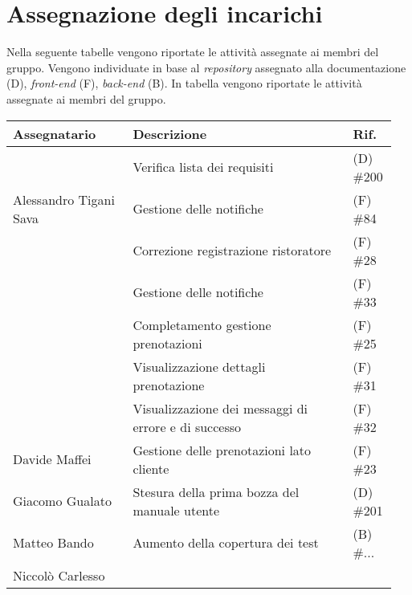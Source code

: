 \section{Assegnazione degli incarichi}
Nella seguente tabelle vengono riportate le attività assegnate ai membri del 
gruppo. Vengono individuate in base al \textit{repository} assegnato alla 
documentazione (D), \textit{front-end} (F), \textit{back-end} (B).
In tabella vengono riportate le attività assegnate ai membri del gruppo.
\begin{center}
	{
		\renewcommand{\arraystretch}{1.5}
		\begin{tabular}{p{0.30\linewidth}|p{0.55\linewidth}|p{0.10\linewidth}}
			\textbf{Assegnatario}        & \textbf{Descrizione} & \textbf{Rif.} \\

			\hline
			\multirow{3}{*}{Alessandro Tigani Sava} & Verifica lista dei requisiti							& (D) \#200            \\ 
			\cline{2-3}
													& Gestione delle notifiche								& (F) \#84             \\
			\hline
			\multirow{5}{*}{Carlo Rosso}			& Correzione registrazione ristoratore					& (F) \#28				\\
			\cline{2-3}
													& Gestione delle notifiche								& (F) \#33            	\\
			\cline{2-3}
													& Completamento gestione prenotazioni					& (F) \#25            	\\
			\cline{2-3}
													& Visualizzazione dettagli prenotazione					& (F) \#31            	\\
			\cline{2-3}
													& Visualizzazione dei messaggi di errore e di successo	& (F) \#32            	\\
			\hline
			Davide Maffei							& Gestione delle prenotazioni lato cliente				& (F) \#23            	\\
			\hline
			Giacomo Gualato							& Stesura della prima bozza del manuale utente			& (D) \#201			\\
			\hline
			Matteo Bando							& Aumento della copertura dei test                      & (B) \#...                \\
			\hline
			Niccolò Carlesso             &                      &               \\
			\hline
		\end{tabular}
	}
\end{center}
